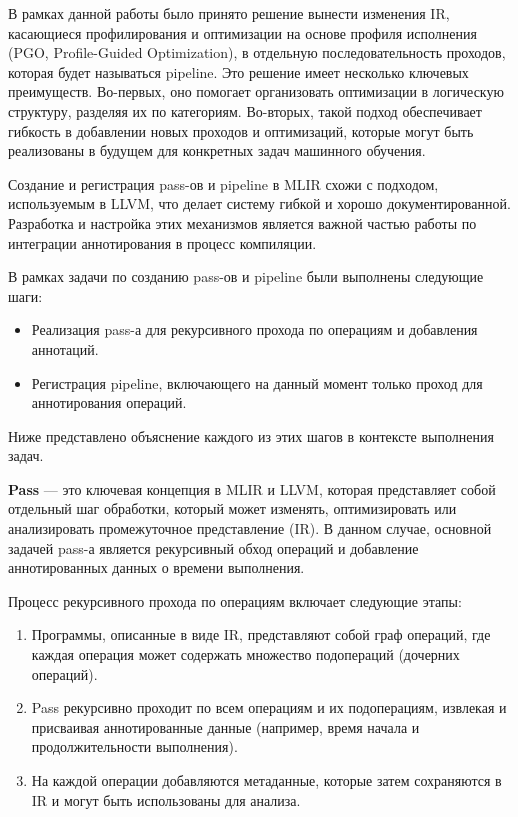 В рамках данной работы было принято решение вынести изменения IR, касающиеся профилирования и оптимизации на основе профиля исполнения (PGO, Profile-Guided Optimization), в отдельную последовательность проходов, которая будет называться pipeline.
Это решение имеет несколько ключевых преимуществ. Во-первых, оно помогает организовать оптимизации в логическую структуру, разделяя их по категориям. Во-вторых, такой подход обеспечивает гибкость в добавлении новых проходов и оптимизаций, которые могут быть реализованы в будущем для конкретных задач машинного обучения.

Создание и регистрация pass-ов и pipeline в MLIR схожи с подходом, используемым в LLVM, что делает систему гибкой и хорошо документированной.
Разработка и настройка этих механизмов является важной частью работы по интеграции аннотирования в процесс компиляции.

В рамках задачи по созданию pass-ов и pipeline были выполнены следующие шаги:

\begin{itemize}
\item Реализация pass-а для рекурсивного прохода по операциям и добавления аннотаций.
\item Регистрация pipeline, включающего на данный момент только проход для аннотирования операций.
\end{itemize}

Ниже представлено объяснение каждого из этих шагов в контексте выполнения задач.

\textbf{Pass} — это ключевая концепция в MLIR и LLVM, которая представляет собой отдельный шаг обработки, который может изменять, оптимизировать или анализировать промежуточное представление (IR).
 В данном случае, основной задачей pass-а является рекурсивный обход операций и добавление аннотированных данных о времени выполнения.

Процесс рекурсивного прохода по операциям включает следующие этапы:

\begin{enumerate}
    \item Программы, описанные в виде IR, представляют собой граф операций, где каждая операция может содержать множество подопераций (дочерних операций).
    \item Pass рекурсивно проходит по всем операциям и их подоперациям, извлекая и присваивая аннотированные данные (например, время начала и продолжительности выполнения).
    \item На каждой операции добавляются метаданные, которые затем сохраняются в IR и могут быть использованы для анализа.
\end{enumerate}

